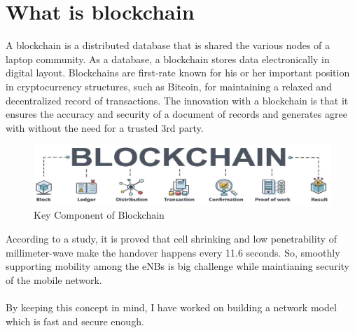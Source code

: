 \section{What is blockchain}{
    A blockchain is a distributed database that is shared the 
    various nodes of a laptop community. As a database, a 
    blockchain stores data electronically in digital layout. 
    Blockchains are first-rate known for his or her important 
    position in cryptocurrency structures, such as Bitcoin, 
    for maintaining a relaxed and decentralized record of 
    transactions. The innovation with a blockchain is that it 
    ensures the accuracy and security of a document of records 
    and generates agree with without the need for a trusted 3rd 
    party.\\
}
\begin{figure}[ht]
    \centering
    \includegraphics[scale=0.5]{img/blockchain.jpg}
    \caption{Key Component of Blockchain}
\end{figure}

\vspace{1cm}

{
    According to a study, it is proved that cell shrinking and low 
    penetrability of millimeter-wave make the handover happens 
    every 11.6 seconds. So, smoothly supporting mobility among the eNBs 
    is big challenge while maintianing security of the mobile network.\\\\
}
{
    By keeping this concept in mind, I have worked on building a
    network model which is fast and secure enough.
}